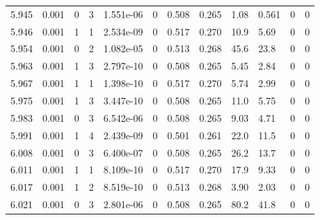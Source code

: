 \documentclass[preview]{standalone}
\begin{document}
{{{{{{{{{{{{{{{{\begin{tabular}{L{1.2cm}C{1.2cm} C{0.3cm}C{0.5cm} C{1.4cm}C{1.4cm} C{1.4cm}C{1.4cm} C{1.6cm}C{1.6cm} C{1.6cm}C{1.6cm}}
  5.945  &  0.001  & 0     &  3 &  1.551e-06  & 0  &  0.508&   0.265& 1.08 & 0.561   &  0 & 0  \\ 
  5.946  &  0.001  & 1     &  1 &  2.534e-09  & 0  &  0.517&   0.270& 10.9 & 5.69   &  0 & 0  \\ 
  5.954  &  0.001  & 0     &  2 &  1.082e-05  & 0  &  0.513&   0.268& 45.6 & 23.8   &  0 & 0  \\ 
  5.963  &  0.001  & 1     &  3 &  2.797e-10  & 0  &  0.508&   0.265& 5.45 & 2.84   &  0 & 0  \\ 
  5.967  &  0.001  & 1     &  1 &  1.398e-10  & 0  &  0.517&   0.270& 5.74 & 2.99   &  0 & 0  \\ 
  5.975  &  0.001  & 1     &  3 &  3.447e-10  & 0  &  0.508&   0.265& 11.0 & 5.75   &  0 & 0  \\ 
  5.983  &  0.001  & 0     &  3 &  6.542e-06  & 0  &  0.508&   0.265& 9.03 & 4.71   &  0 & 0  \\ 
  5.991  &  0.001  & 1     &  4 &  2.439e-09  & 0  &  0.501&   0.261& 22.0 & 11.5   &  0 & 0  \\ 
  6.008  &  0.001  & 0     &  3 &  6.400e-07  & 0  &  0.508&   0.265& 26.2 & 13.7   &  0 & 0  \\ 
  6.011  &  0.001  & 1     &  1 &  8.109e-10  & 0  &  0.517&   0.270& 17.9 & 9.33   &  0 & 0  \\ 
  6.017  &  0.001  & 1     &  2 &  8.519e-10  & 0  &  0.513&   0.268& 3.90 & 2.03   &  0 & 0  \\ 
  6.021  &  0.001  & 0     &  3 &  2.801e-06  & 0  &  0.508&   0.265& 80.2 & 41.8   &  0 & 0  \\ 
\hline 
\end{tabular} 

}}}}}}}}}}}}}}}}
\end{document}
